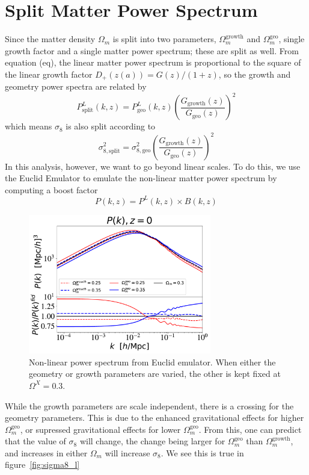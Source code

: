 \section{Split Matter Power Spectrum}
Since the matter density $\Omega_m$ is split into two parameters, $\Omega_m^{\text{growth}}$ and $\Omega_m^{\text{geo}}$, single growth factor and a single matter power spectrum; these are split as well. From equation (eq), the linear matter power spectrum is proportional to the square of the linear growth factor $D_+(z(a)) = G(z)/(1+z)$, so the growth and geometry power spectra are related by
\begin{equation}
	P^L_{\text{split}}(k,z) = P^L_{\text{geo}}(k,z) \left(\frac{G_{\text{growth}}(z)}{G_{\text{geo}}(z)}\right)^2
\end{equation}
which means $\sigma_8$ is also split according to
\begin{equation}
	\sigma_{8,\text{split}}^2 = \sigma_{8,\text{geo}}^2 \left(\frac{G_{\text{growth}}(z)}{G_{\text{geo}}(z)}\right)^2
\end{equation}
In this analysis, however, we want to go beyond linear scales. To do this, we use the Euclid Emulator to emulate the non-linear matter power spectrum by computing a boost factor
\begin{equation}
	P(k,z) = P^L(k,z) \times B(k,z)
\end{equation}
\begin{figure}[ht]
	\centering
	\includegraphics[width=8cm]{plots/Pk.pdf}
	\caption{Non-linear power spectrum from Euclid emulator. When either the geometry or growth parameters are varied, the other is kept fixed at $\Omega^X=0.3$.}
	\label{fig:pk}
\end{figure}
While the growth parameters are scale independent, there is a crossing for the geometry parameters. This is due to the enhanced gravitational effects for higher $\Omega_m^{\mathrm{geo}}$, or supressed gravitational effects for lower $\Omega_m^\mathrm{geo}$. From this, one can predict that the value of $\sigma_8$ will change, the change being larger for $\Omega_m^\mathrm{geo}$ than $\Omega_m^\mathrm{growth}$, and increases in either $\Omega_m$ will increase $\sigma_8$. We see this is true in figure~\ref{fig:sigma8_l}
